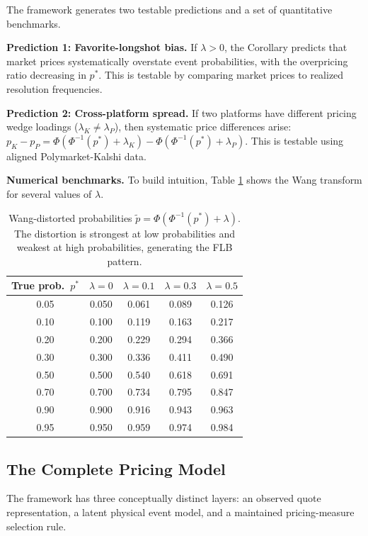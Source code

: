 \documentclass[12pt,a4paper]{article}
\begin{document}
The framework generates two testable predictions and a set of
quantitative benchmarks.

\textbf{Prediction 1: Favorite-longshot bias.} If \(\lambda > 0\),
the Corollary predicts that market prices systematically overstate event
probabilities, with the overpricing ratio decreasing in \(p^*\). This is
testable by comparing market prices to realized resolution frequencies.

\textbf{Prediction 2: Cross-platform spread.} If two platforms have
different pricing wedge loadings (\(\lambda_K \neq \lambda_P\)), then
systematic price differences arise:
\(p_K - p_P = \Phi(\Phi^{-1}(p^*) + \lambda_K) - \Phi(\Phi^{-1}(p^*) + \lambda_P)\).
This is testable using aligned Polymarket-Kalshi data.

\textbf{Numerical benchmarks.} To build intuition, Table
\ref{tab:wang_benchmarks} shows the Wang transform for several values of
\(\lambda\).

\begin{table}[H]
\centering
\begin{tabular}{ccccc}
\toprule
True prob.\ $p^*$ & $\lambda = 0$ & $\lambda = 0.1$ & $\lambda = 0.3$ & $\lambda = 0.5$ \\
\midrule
0.05 & 0.050 & 0.061 & 0.089 & 0.126 \\
0.10 & 0.100 & 0.119 & 0.163 & 0.217 \\
0.20 & 0.200 & 0.229 & 0.294 & 0.366 \\
0.30 & 0.300 & 0.336 & 0.411 & 0.490 \\
0.50 & 0.500 & 0.540 & 0.618 & 0.691 \\
0.70 & 0.700 & 0.734 & 0.795 & 0.847 \\
0.90 & 0.900 & 0.916 & 0.943 & 0.963 \\
0.95 & 0.950 & 0.959 & 0.974 & 0.984 \\
\bottomrule
\end{tabular}
\caption{Wang-distorted probabilities $\tilde{p} = \Phi(\Phi^{-1}(p^*) + \lambda)$. The distortion is strongest at low probabilities and weakest at high probabilities, generating the FLB pattern.}
\label{tab:wang_benchmarks}
\end{table}

\subsection{The Complete Pricing
Model}\label{the-complete-pricing-model}

The framework has three conceptually distinct layers: an observed quote representation, a latent physical event model, and a maintained pricing-measure selection rule.
\end{document}
